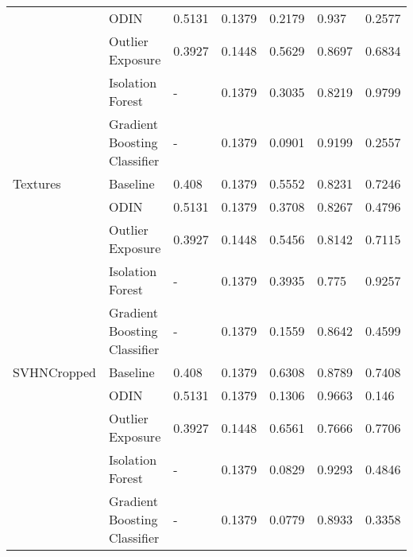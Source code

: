 \begin{tabular}{lllllll}
            & ODIN &        0.5131 &               0.1379 &    0.2179 &   0.937 &         0.2577 \\
            & Outlier Exposure &        0.3927 &               0.1448 &    0.5629 &  0.8697 &         0.6834 \\
            & Isolation Forest &             - &               0.1379 &    0.3035 &  0.8219 &         0.9799 \\
            & Gradient Boosting Classifier &             - &               0.1379 &    0.0901 &  0.9199 &         0.2557 \\
Textures & Baseline &         0.408 &               0.1379 &    0.5552 &  0.8231 &         0.7246 \\
            & ODIN &        0.5131 &               0.1379 &    0.3708 &  0.8267 &         0.4796 \\
            & Outlier Exposure &        0.3927 &               0.1448 &    0.5456 &  0.8142 &         0.7115 \\
            & Isolation Forest &             - &               0.1379 &    0.3935 &   0.775 &         0.9257 \\
            & Gradient Boosting Classifier &             - &               0.1379 &    0.1559 &  0.8642 &         0.4599 \\
SVHNCropped & Baseline &         0.408 &               0.1379 &    0.6308 &  0.8789 &         0.7408 \\
            & ODIN &        0.5131 &               0.1379 &    0.1306 &  0.9663 &          0.146 \\
            & Outlier Exposure &        0.3927 &               0.1448 &    0.6561 &  0.7666 &         0.7706 \\
            & Isolation Forest &             - &               0.1379 &    0.0829 &  0.9293 &         0.4846 \\
            & Gradient Boosting Classifier &             - &               0.1379 &    0.0779 &  0.8933 &         0.3358 \\
\bottomrule
\end{tabular}
